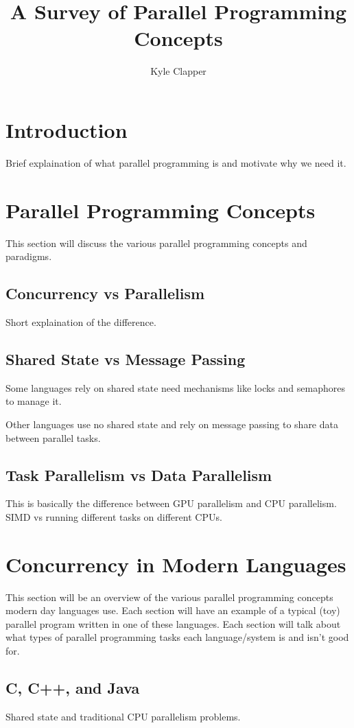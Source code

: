 \documentclass{article}
\title{A Survey of Parallel Programming Concepts}
\author{Kyle Clapper}
\begin{document}
\maketitle

\section{Introduction}
Brief explaination of what parallel programming is and motivate
why we need it.

\section{Parallel Programming Concepts}
This section will discuss the various parallel programming
concepts and paradigms.

\subsection{Concurrency vs Parallelism}
Short explaination of the difference.

\subsection{Shared State vs Message Passing}
Some languages rely on shared state need mechanisms like
locks and semaphores to manage it.

Other languages use no shared state and rely on message passing to
share data between parallel tasks.

\subsection{Task Parallelism vs Data Parallelism}
This is basically the difference between GPU parallelism
and CPU parallelism. SIMD vs running different tasks on
different CPUs.

\section{Concurrency in Modern Languages}
This section will be an overview of the various parallel programming
concepts modern day languages use. Each section will have an example of
a typical (toy) parallel program written in one of these languages. Each
section will talk about what types of parallel programming tasks
each language/system is and isn't good for.

\subsection{C, C++, and Java}
Shared state and traditional CPU parallelism problems.
\end{document}

